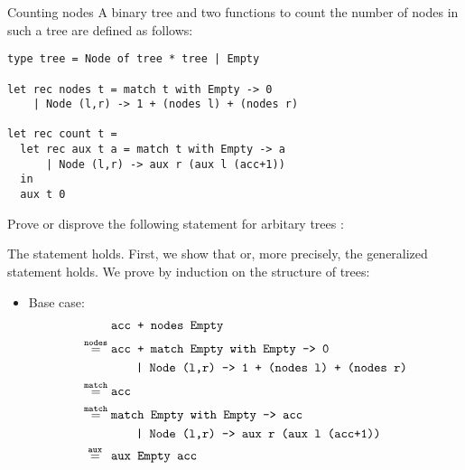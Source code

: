 \documentclass[
  english
]{tumteaching}
\newcommand{\qsmio}[1]{\text{\texttt{#1}}}
\begin{document}
\begin{assignment}[L]{Counting nodes}
  A binary tree and two functions to count the number of nodes in such a tree are defined as follows:
  \begin{verbatim}
type tree = Node of tree * tree | Empty

let rec nodes t = match t with Empty -> 0
    | Node (l,r) -> 1 + (nodes l) + (nodes r)

let rec count t =
  let rec aux t a = match t with Empty -> a
      | Node (l,r) -> aux r (aux l (acc+1))
  in
  aux t 0
  \end{verbatim}
  Prove or disprove the following statement for arbitary trees :
  \begin{center}
  \end{center}

  \begin{solution}
    The statement holds. First, we show that  or, more precisely, the generalized statement  holds. We prove by induction on the structure of trees:
    \begin{itemize}
      \item Base case: 
      \begin{align*}
        &\;\qsmio{acc + nodes Empty}\\
        \overset{\qsmio{nodes}}{=}&\;\qsmio{acc + match Empty with Empty -> 0}\\
        &\;\qquad\qsmio{| Node (l,r) -> 1 + (nodes l) + (nodes r)}\\
        \overset{\qsmio{match}}{=}&\;\qsmio{acc}\\
        \overset{\qsmio{match}}{=}&\;\qsmio{match Empty with Empty -> acc}\\
        &\;\qquad\qsmio{| Node (l,r) -> aux r (aux l (acc+1))}\\
        \overset{\qsmio{aux}}{=}\hspace*{1.5mm}&\;\qsmio{aux Empty acc}\\
      \end{align*}


\end{itemize}
\end{solution}
\end{assignment}
\end{document}
